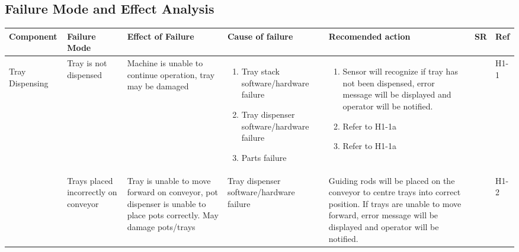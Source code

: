 \documentclass{article}
\begin{document}
\newpage
\begin{landscape}
\section{Failure Mode and Effect Analysis}

\begin{center}
    \begin{longtable}{|l|  p{3cm}  p{4cm}  p{4cm}  p{4cm}  p{1cm}  p{1cm}|}
        \hline
        Component&
        Failure Mode&
        Effect of Failure&
        Cause of failure &
        Recomended action &
        SR&
        Ref \\
        \hline
        \begin{centering}
        Tray Dispensing
        \end{centering} &
        Tray is not dispensed & 
        Machine is unable to continue operation, tray may be damaged & 
              \begin{enumerate}[label=(\alph*)]
                  \item Tray stack software/hardware failure
                  \item Tray dispenser software/hardware failure 
                  \item Parts failure 
              \end{enumerate} &
              \begin{enumerate}[label=(\alph*)]
                  \item  Sensor will recognize if tray has not been dispensed, error message will be displayed and operator will be notified.
                  \item  Refer to H1-1a
                  \item Refer to H1-1a
              \end{enumerate}&
          &
          H1-1\\
 
         &
        Trays placed incorrectly on conveyor&
        Tray is unable to move forward on conveyor, pot dispenser is unable to place pots correctly. May damage pots/trays&
        Tray dispenser software/hardware failure&
        Guiding rods will be placed on the conveyor to centre trays into correct position. If trays are unable to move forward, error message will be displayed and operator will be notified.&
        &
        H1-2\\


\end{longtable}
\end{center}
\end{landscape}
\end{document}
